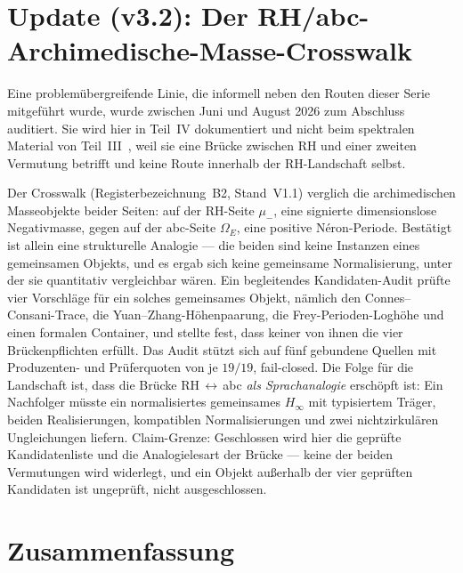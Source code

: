 \documentclass[12pt,a4paper]{article}
\theoremstyle{definition}
\theoremstyle{remark}
\begin{document}
\section{Update (v3.2): Der RH/abc-Archimedische-Masse-Crosswalk}
\label{sec:v32-abc}

Eine problemübergreifende Linie, die informell neben den Routen dieser
Serie mitgeführt wurde, wurde zwischen Juni und August 2026 zum Abschluss
auditiert. Sie wird hier in Teil~IV dokumentiert und nicht beim spektralen
Material von Teil~III~\cite{Geiger2026partIII}, weil sie eine Brücke
zwischen RH und einer zweiten Vermutung betrifft und keine Route innerhalb
der RH-Landschaft selbst.

Der Crosswalk (Registerbezeichnung~B2, Stand~V1.1) verglich die
archimedischen Masseobjekte beider Seiten: auf der RH-Seite $\mu_-$, eine
signierte dimensionslose Negativmasse, gegen auf der abc-Seite $\Omega_E$,
eine positive N\'eron-Periode. Bestätigt ist allein eine strukturelle
Analogie --- die beiden sind keine Instanzen eines gemeinsamen Objekts, und
es ergab sich keine gemeinsame Normalisierung, unter der sie quantitativ
vergleichbar wären. Ein begleitendes Kandidaten-Audit prüfte vier
Vorschläge für ein solches gemeinsames Objekt, nämlich den
Connes--Consani-Trace, die Yuan--Zhang-Höhenpaarung, die
Frey-Perioden-Loghöhe und einen formalen Container, und stellte fest, dass
keiner von ihnen die vier Brückenpflichten erfüllt. Das Audit stützt sich
auf fünf gebundene Quellen mit Produzenten- und Prüferquoten von je
$19/19$, fail-closed. Die Folge für die Landschaft ist, dass die Brücke
RH\,$\leftrightarrow$\,abc \emph{als Sprachanalogie} erschöpft ist: Ein
Nachfolger müsste ein normalisiertes gemeinsames $H_\infty$ mit typisiertem
Träger, beiden Realisierungen, kompatiblen Normalisierungen und zwei
nichtzirkulären Ungleichungen liefern. Claim-Grenze: Geschlossen wird hier
die geprüfte Kandidatenliste und die Analogielesart der Brücke --- keine
der beiden Vermutungen wird widerlegt, und ein Objekt außerhalb der vier
geprüften Kandidaten ist ungeprüft, nicht ausgeschlossen.


\section{Zusammenfassung}
\label{sec:summary}
\end{document}
